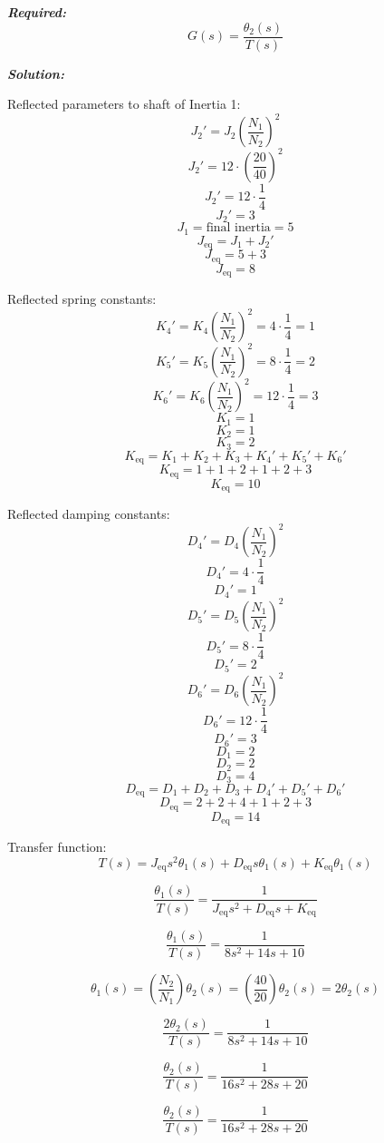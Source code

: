 \documentclass[11pt]{article}
\begin{document}
\vspace{12pt}

\noindent \textbf{\textit{Required:}}
\[
G(s) = \frac{\theta_2(s)}{T(s)}
\]

\vspace{12pt}


\noindent\textbf{\textit{Solution:}}

Reflected parameters to shaft of Inertia 1:
\[
J_2' = J_2 \left( \frac{N_1}{N_2} \right)^2 
\]
\[
J_2' = 12 \cdot \left( \frac{20}{40} \right)^2 
\]
\[
J_2' = 12 \cdot \frac{1}{4} 
\]
\[
J_2' = 3
\]
\[
J_1 = \text{final inertia} = 5
\]
\[
J_{\text{eq}} = J_1 + J_2' 
\]
\[
J_{\text{eq}} = 5 + 3 
\]
\[
J_{\text{eq}} = 8
\]

Reflected spring constants:
\[
K_4' = K_4 \left( \frac{N_1}{N_2} \right)^2 = 4 \cdot \frac{1}{4} = 1
\]
\[
K_5' = K_5 \left( \frac{N_1}{N_2} \right)^2 = 8 \cdot \frac{1}{4} = 2
\]
\[
K_6' = K_6 \left( \frac{N_1}{N_2} \right)^2 = 12 \cdot \frac{1}{4} = 3
\]
\[
K_1 = 1
\]
\[
K_2 = 1
\]
\[
K_3 = 2
\]
\[
K_{\text{eq}} = K_1 + K_2 + K_3 + K_4' + K_5' + K_6' 
\]
\[
K_{\text{eq}} = 1 + 1 + 2 + 1 + 2 + 3 
\]
\[
K_{\text{eq}} = 10
\]

Reflected damping constants:
\[
D_4' = D_4 \left( \frac{N_1}{N_2} \right)^2 
\]
\[
D_4' = 4 \cdot \frac{1}{4} 
\]
\[
D_4' = 1
\]
\[
D_5' = D_5 \left( \frac{N_1}{N_2} \right)^2 
\]
\[
D_5' = 8 \cdot \frac{1}{4} 
\]
\[
D_5' = 2
\]
\[
D_6' = D_6 \left( \frac{N_1}{N_2} \right)^2 
\]
\[
D_6' = 12 \cdot \frac{1}{4} 
\]
\[
D_6' = 3
\]
\[
D_1 = 2
\]
\[
D_2 = 2
\]
\[
D_3 = 4
\]
\[
D_{\text{eq}} = D_1 + D_2 + D_3 + D_4' + D_5' + D_6' 
\]
\[
D_{\text{eq}} = 2 + 2 + 4 + 1 + 2 + 3 
\]
\[
D_{\text{eq}} = 14
\]

Transfer function:
\[
T(s) = J_{\text{eq}} s^2 \theta_1(s) + D_{\text{eq}} s \theta_1(s) + K_{\text{eq}} \theta_1(s)
\]

\[
\frac{\theta_1(s)}{T(s)} = \frac{1}{J_{\text{eq}} s^2 + D_{\text{eq}} s + K_{\text{eq}}}
\]

\[
\frac{\theta_1(s)}{T(s)} = \frac{1}{8 s^2 + 14 s + 10}
\]

\[
\theta_1(s) = \left( \frac{N_2}{N_1} \right) \theta_2(s) = \left( \frac{40}{20} \right) \theta_2(s) = 2\theta_2(s)
\]

\[
\frac{2\theta_2(s)}{T(s)} = \frac{1}{8 s^2 + 14 s + 10}
\]

\[
\frac{\theta_2(s)}{T(s)} = \frac{1}{16 s^2 + 28 s + 20}
\]

\[
\boxed{\frac{\theta_2(s)}{T(s)} = \frac{1}{16 s^2 + 28 s + 20}}
\]
\end{document}
